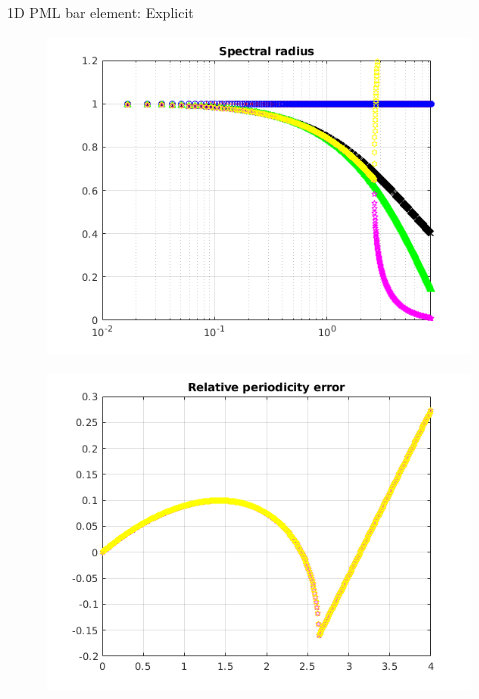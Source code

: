 \begin{frame}{1D PML bar element: Explicit}
\begin{figure}[ht]
\begin{minipage}[b]{0.5\linewidth}
  \end{minipage}%
  \begin{minipage}[b]{0.5\linewidth}
    \centering
    \includegraphics[scale=.35]{images/pml1d-exp-2.png} \\
  \end{minipage} 
  \begin{minipage}[b]{0.5\linewidth}
    \centering
    \includegraphics[scale=.35]{images/pml1d-exp-3.png} \\


\end{minipage}
\end{figure}
\end{frame}
